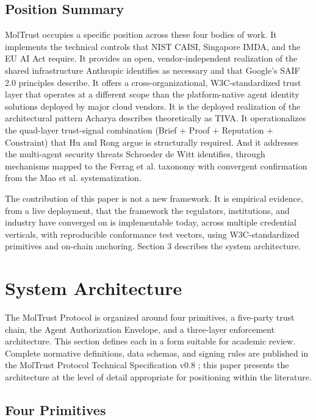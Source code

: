 \subsection{Position Summary}

MolTrust occupies a specific position across these four bodies of work. It implements the technical controls that NIST CAISI, Singapore IMDA, and the EU AI Act require. It provides an open, vendor-independent realization of the shared infrastructure Anthropic identifies as necessary and that Google's SAIF 2.0 principles describe. It offers a cross-organizational, W3C-standardized trust layer that operates at a different scope than the platform-native agent identity solutions deployed by major cloud vendors. It is the deployed realization of the architectural pattern Acharya describes theoretically as TIVA. It operationalizes the quad-layer trust-signal combination (Brief + Proof + Reputation + Constraint) that Hu and Rong argue is structurally required. And it addresses the multi-agent security threats Schroeder de Witt identifies, through mechanisms mapped to the Ferrag et al. taxonomy with convergent confirmation from the Mao et al. systematization.


The contribution of this paper is not a new framework. It is empirical evidence, from a live deployment, that the framework the regulators, institutions, and industry have converged on is implementable today, across multiple credential verticals, with reproducible conformance test vectors, using W3C-standardized primitives and on-chain anchoring. Section 3 describes the system architecture.



\section{System Architecture}

The MolTrust Protocol is organized around four primitives, a five-party trust chain, the Agent Authorization Envelope, and a three-layer enforcement architecture. This section defines each in a form suitable for academic review. Complete normative definitions, data schemas, and signing rules are published in the MolTrust Protocol Technical Specification v0.8 \cite{ref28_techspec}; this paper presents the architecture at the level of detail appropriate for positioning within the literature.


\subsection{Four Primitives}

